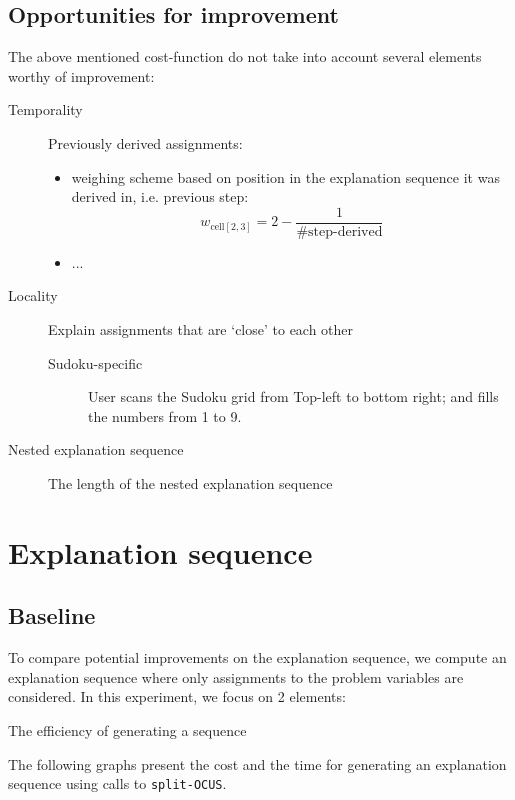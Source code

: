 \documentclass[a4paper,UKenglish,cleveref, autoref, cleveref, thm-restate,pdfa]{lipics-v2021}
\begin{document}
	\subsection{Opportunities for improvement}
	The above mentioned cost-function do not take into account several elements worthy of improvement:
	\begin{description}
		\item[Temporality] Previously derived assignments:
		\begin{itemize}
			\item weighing scheme based on position in the explanation sequence it was derived in, i.e. previous step: 
			\[w_{\text{cell}[2, 3]} = 2 - \frac{1}{\text{\# step-derived}} \]
			\item ...
		\end{itemize}
		\item[Locality] Explain assignments that are `close' to each other
		\begin{description}
		\item[Sudoku-specific] User scans the Sudoku grid from Top-left to bottom right; and fills the numbers from 1 to 9.
		\end{description}
		\item[Nested explanation sequence] The length of the nested explanation sequence
	\end{description}

	
	\section{Explanation sequence}
	
	\subsection{Baseline}
	
	To compare potential improvements on the explanation sequence, we compute an explanation sequence where only assignments to the problem variables are considered. In this experiment, we focus on 2 elements: 
	\begin{inparaenum}
		\item The efficiency of generating a sequence
	\end{inparaenum}
	The following graphs present the cost and the time for generating an explanation sequence using calls to \texttt{split-OCUS}. 
	
	
	
\end{document}
